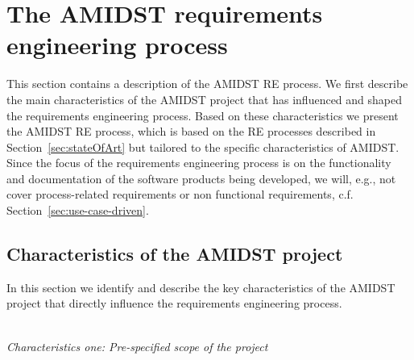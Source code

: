 \section{The AMIDST requirements engineering process}
\label{sec:AmidstRequirementProcess}

This section contains a description of the AMIDST RE process.  We first describe the main characteristics of the AMIDST project that
has influenced and shaped the requirements engineering process. Based on these characteristics we present the
AMIDST RE process, which is based on the RE processes described in
Section~\ref{sec:stateOfArt} but tailored to the specific characteristics of AMIDST. Since the focus of the requirements engineering process
is on the functionality and documentation of the software products being developed, we will, e.g., not cover
process-related requirements or non functional requirements, c.f. Section~\ref{sec:use-case-driven}.





\subsection{Characteristics of the AMIDST project}
\label{sec:characteristics}

In this section we identify and describe the key characteristics of the AMIDST project that directly influence the requirements
engineering process. 


\ \\
\noindent \emph{Characteristics one:  Pre-specified scope of the project}
\label{sec:characteristic1}


